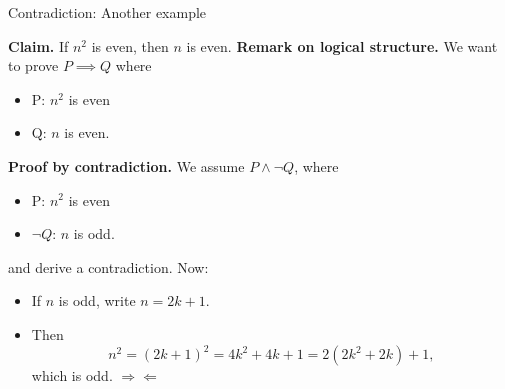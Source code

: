 \documentclass[10pt]{beamer}
\begin{document}
\begin{frame}{Contradiction: Another example}

\small 
\begin{mybluebox}[title=\text{Example: Prove the following claim.}]
\textbf{Claim.} If $n^2$ is even, then $n$ is even.
\pause
\vfill 
\textbf{Remark on logical structure.} We want to prove $P \implies Q$
where
\begin{itemize}
\item P: $n^2$ is even
\item Q: $n$ is even.	
\end{itemize}
\pause
\vfill 
\textbf{Proof by contradiction.} We assume $P \land \lnot Q$, where
\begin{itemize}
\item P: $n^2$ is even
\item $\lnot Q$: $n$ is odd.	
\end{itemize}
and derive a contradiction.
\pause
\vfill 
Now:
\begin{itemize}
	\item If $n$ is odd, write $n = 2k+1$. \pause 
	\item Then
	\[ n^2 = (2k+1)^2 = 4k^2 + 4k + 1 = 2(2k^2 + 2k) + 1, \]
	which is odd. \; $\Rightarrow\Leftarrow$
\end{itemize}



\end{mybluebox}


\end{frame}


\end{document}

